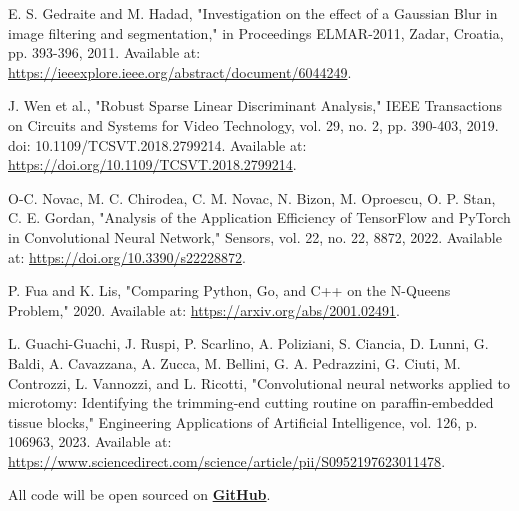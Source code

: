 \begin{thebibliography}{99}
    E. S. Gedraite and M. Hadad, "Investigation on the effect of a Gaussian Blur in image filtering and segmentation," in Proceedings ELMAR-2011, Zadar, Croatia, pp. 393-396, 2011. Available at: \url{https://ieeexplore.ieee.org/abstract/document/6044249}.
    
    J. Wen et al., "Robust Sparse Linear Discriminant Analysis," IEEE Transactions on Circuits and Systems for Video Technology, vol. 29, no. 2, pp. 390-403, 2019. doi: 10.1109/TCSVT.2018.2799214. Available at: \url{https://doi.org/10.1109/TCSVT.2018.2799214}.
    
    O-C. Novac, M. C. Chirodea, C. M. Novac, N. Bizon, M. Oproescu, O. P. Stan, C. E. Gordan, "Analysis of the Application Efficiency of TensorFlow and PyTorch in Convolutional Neural Network," Sensors, vol. 22, no. 22, 8872, 2022. Available at: \url{https://doi.org/10.3390/s22228872}.
    
    P. Fua and K. Lis, "Comparing Python, Go, and C++ on the N-Queens Problem," 2020. Available at: \url{https://arxiv.org/abs/2001.02491}.
    
    L. Guachi-Guachi, J. Ruspi, P. Scarlino, A. Poliziani, S. Ciancia, D. Lunni, G. Baldi, A. Cavazzana, A. Zucca, M. Bellini, G. A. Pedrazzini, G. Ciuti, M. Controzzi, L. Vannozzi, and L. Ricotti, "Convolutional neural networks applied to microtomy: Identifying the trimming-end cutting routine on paraffin-embedded tissue blocks," Engineering Applications of Artificial Intelligence, vol. 126, p. 106963, 2023. Available at: \url{https://www.sciencedirect.com/science/article/pii/S0952197623011478}.
    
\end{thebibliography}


All code will be open sourced on \href{https://github.com/hw3579/final-project-code}{\textbf{GitHub}}.